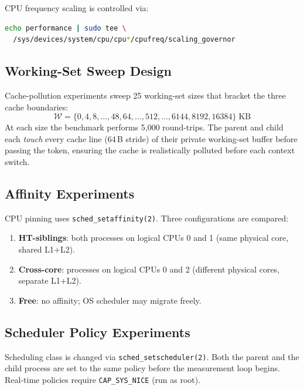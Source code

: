 \documentclass[conference]{IEEEtran}
\begin{document}
CPU frequency scaling is controlled via:
\begin{lstlisting}[language=bash, caption=Fixing CPU governor]
echo performance | sudo tee \
  /sys/devices/system/cpu/cpu*/cpufreq/scaling_governor
\end{lstlisting}

\subsection{Working-Set Sweep Design}

Cache-pollution experiments sweep 25 working-set sizes that
bracket the three cache boundaries:
%
\begin{equation}
\mathcal{W} = \{0, 4, 8, \ldots, 48, 64, \ldots, 512, \ldots,
               6144, 8192, 16384\}\;\text{KB}
\end{equation}
%
At each size the benchmark performs 5,000 round-trips.  The parent
and child each \emph{touch} every cache line (64\,B stride) of their
private working-set buffer before passing the token, ensuring the
cache is realistically polluted before each context switch.

\subsection{Affinity Experiments}

CPU pinning uses \texttt{sched\_setaffinity(2)}.  Three configurations
are compared:

\begin{enumerate}
  \item \textbf{HT-siblings}: both processes on logical CPUs 0 and 1
        (same physical core, shared L1+L2).
  \item \textbf{Cross-core}: processes on logical CPUs 0 and 2
        (different physical cores, separate L1+L2).
  \item \textbf{Free}: no affinity; OS scheduler may migrate freely.
\end{enumerate}

\subsection{Scheduler Policy Experiments}

Scheduling class is changed via \texttt{sched\_setscheduler(2)}.
Both the parent and the child process are set to the same policy
before the measurement loop begins.  Real-time policies require
\texttt{CAP\_SYS\_NICE} (run as root).
\end{document}
